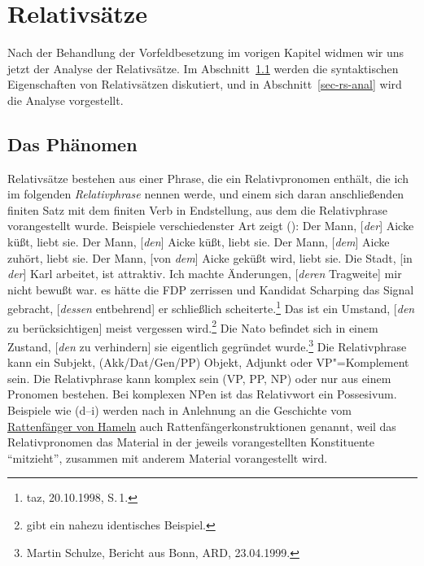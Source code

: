 
\chapter{Relativsätze}
\label{chap-rs}

{%
Nach der Behandlung der Vorfeldbesetzung im vorigen Kapitel widmen wir uns jetzt
der Analyse der Relativsätze. Im Abschnitt~\ref{sec-rs-phenomena} werden die syntaktischen
Eigenschaften von Relativsätzen diskutiert, und in Abschnitt~\ref{sec-rs-anal}
wird die Analyse vorgestellt.

\section{Das Phänomen}
\label{sec-rs-phenomena}

Relativsätze bestehen aus einer Phrase, die ein Relativpronomen enthält, die ich im folgenden
\emph{Relativphrase} nennen werde, und einem sich daran anschließenden finiten Satz mit dem finiten Verb in 
Endstellung, aus dem die Relativphrase vorangestellt wurde. Beispiele verschiedenster Art zeigt ():
\eal
\label{bsp-relativsaetze}
\ex Der Mann, [\emph{der}] Aicke küßt, liebt sie. \label{r1}
\ex Der Mann, [\emph{den}] Aicke küßt, liebt sie. \label{r1b}
\ex Der Mann, [\emph{dem}] Aicke zuhört, liebt sie.\label{r1c}
\ex Der Mann, [von \emph{dem}] Aicke geküßt wird, liebt sie. \label{r2}
\ex Die Stadt, [in \emph{der}] Karl arbeitet, ist attraktiv. \label{r3}
\ex Ich machte Änderungen, [\emph{deren} Tragweite] mir nicht bewußt war.\label{r4}
\ex es hätte die FDP zerrissen und Kandidat Scharping das Signal gebracht, [\emph{dessen} entbehrend] er schließlich scheiterte.\footnote{
  taz, 20.10.1998, S.\,1.}
\ex Das ist ein Umstand, [\emph{den} zu berücksichtigen] meist vergessen wird.\label{r5}\footnote{
  \citet[]{Bech55a} gibt ein nahezu identisches Beispiel.%
}
\ex Die Nato befindet sich in einem Zustand, [\emph{den} zu verhindern] sie eigentlich gegründet wurde.\footnote{
  Martin Schulze, Bericht aus Bonn, ARD, 23.04.1999.}
\zl
Die Relativphrase kann ein Subjekt, (Akk/Dat/Gen/PP) Objekt, Adjunkt oder VP"=Komplement sein.
\label{page-rattenfaenger}%
Die Relativphrase kann komplex sein (VP, PP, NP) oder nur aus einem Pronomen bestehen.
Bei komplexen NPen ist das Relativwort ein Possesivum. 
Beispiele wie (d--i) werden nach \citet*[]{Ross67} in Anlehnung an die Geschichte vom 
\href{http://www.hameln.de/tourismus/rattenfaenger/}{Rat\-ten\-fän\-ger von Hameln} 
auch Rattenfängerkonstruktionen genannt,
weil das Relativpronomen das Material in der jeweils vorangestellten Konstituente "`mitzieht"', \dash
zusammen mit anderem Material vorangestellt wird.

}
